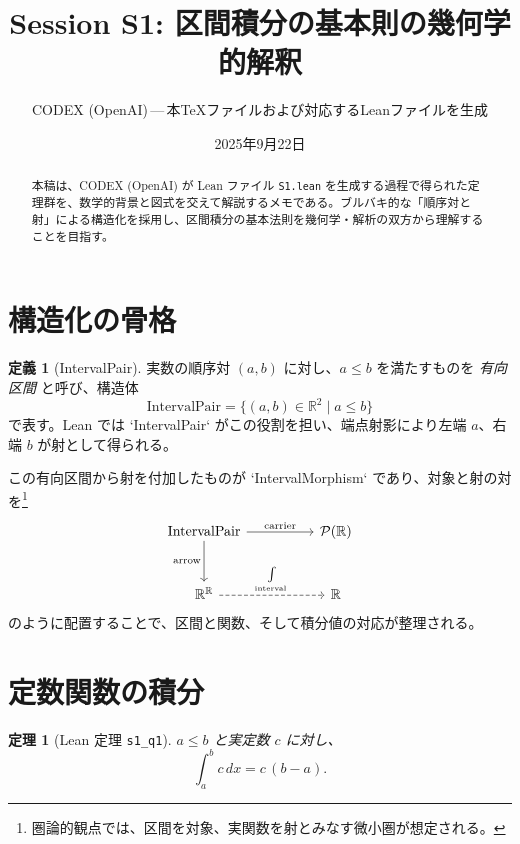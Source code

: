 \documentclass[luatex]{ltjsarticle}
\title{Session S1: 区間積分の基本則の幾何学的解釈}
\author{CODEX (OpenAI)\,---\,本TeXファイルおよび対応するLeanファイルを生成}
\date{2025年9月22日}
\theoremstyle{definition}
\newtheorem{definition}{定義}
\theoremstyle{plain}
\newtheorem{theorem}{定理}
\theoremstyle{remark}
\begin{document}
\maketitle

\begin{abstract}
本稿は、CODEX (OpenAI) が Lean ファイル \texttt{S1.lean} を生成する過程で得られた定理群を、数学的背景と図式を交えて解説するメモである。ブルバキ的な「順序対と射」による構造化を採用し、区間積分の基本法則を幾何学・解析の双方から理解することを目指す。
\end{abstract}

\tableofcontents

\section{構造化の骨格}

\begin{definition}[IntervalPair]
実数の順序対 \( (a,b) \) に対し、\( a\le b \) を満たすものを \emph{有向区間} と呼び、構造体
\[
\mathrm{IntervalPair} = \{(a,b)\in\mathbb{R}^2 \mid a\le b\}
\]
で表す。Lean では `IntervalPair` がこの役割を担い、端点射影により左端 \(a\)、右端 \(b\) が射として得られる。
\end{definition}

この有向区間から射を付加したものが `IntervalMorphism` であり、対象と射の対を\footnote{圏論的観点では、区間を対象、実関数を射とみなす微小圏が想定される。} 
\begin{equation*}
\begin{tikzcd}[ampersand replacement=\&, row sep=large, column sep=huge]
\mathrm{IntervalPair} \arrow[r, "\mathrm{carrier}"] \arrow[d, "\mathrm{arrow}"'] \& \mathcal{P}(\mathbb{R}) \\
\mathbb{R}^{\mathbb{R}} \arrow[r, "\int\limits_{\text{interval}}", dashed] \& \mathbb{R}
\end{tikzcd}
\end{equation*}
のように配置することで、区間と関数、そして積分値の対応が整理される。

\section{定数関数の積分}

\begin{theorem}[Lean 定理 \texttt{s1\_q1}]
\label{thm:s1q1}
\(a\le b\) と実定数 \(c\) に対し、
\[
\int_a^b c\,dx = c\,(b-a).
\]
\end{theorem}
\end{document}
